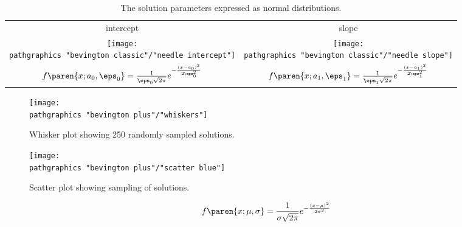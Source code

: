 \begin{table}[htbp]  %
    \caption{The solution parameters expressed as normal distributions.}
    \begin{center}
        \begin{tabular}{cc}
            intercept & slope \\
            \texttt{[image: \\pathgraphics "bevington classic"/"needle intercept"]} &
            \texttt{[image: \\pathgraphics "bevington classic"/"needle slope"]} \\
            $f\paren{x;a_{0},\eps_{0}} = \frac{1}{\eps_{0} \sqrt{2\pi}} e^{-\frac{(x - a_{0})^{2}}{2\eps_{0}^{2}}}$ &
            $f\paren{x;a_{1},\eps_{1}} = \frac{1}{\eps_{1} \sqrt{2\pi}} e^{-\frac{(x - a_{1})^{2}}{2\eps_{1}^{2}}}$ \\
        \end{tabular}
    \end{center}
\end{table}%

\begin{figure}[htbp] %
   \centering
   \texttt{[image: \\pathgraphics "bevington plus"/"whiskers"]} 
   \caption[Whisker plot showing 250 randomly sampled solutions.]{Whisker plot showing 250 randomly sampled solutions.}
\end{figure}

\begin{figure}[htbp] %
   \centering
   \texttt{[image: \\pathgraphics "bevington plus"/"scatter blue"]} 
   \caption[Scatter plot showing sampling of solutions.]{Scatter plot showing sampling of solutions.}
\end{figure}

  \begin{equation*}   %
    f\paren{x;\mu,\sigma} = \frac{1}{\sigma \sqrt{2\pi}} e^{-\frac{(x-\mu)^{2}}{2\sigma^{2}}}
  \end{equation*}

